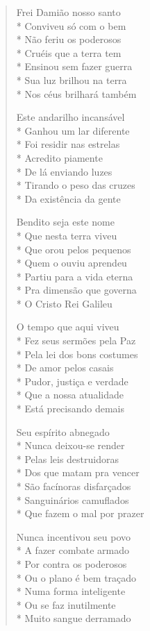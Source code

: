 \begin{verse}
Frei Damião nosso santo\\*
Conviveu só com o bem\\*
Não feriu os poderosos\\*
Cruéis que a terra tem\\*
Ensinou sem fazer guerra\\*
Sua luz brilhou na terra\\*
Nos céus brilhará também

Este andarilho incansável\\*
Ganhou um lar diferente\\*
Foi residir nas estrelas\\*
Acredito piamente\\*
De lá enviando luzes\\*
Tirando o peso das cruzes\\*
Da existência da gente

Bendito seja este nome\\*
Que nesta terra viveu\\*
Que orou pelos pequenos\\*
Quem o ouviu aprendeu\\*
Partiu para a vida eterna\\*
Pra dimensão que governa\\*
O Cristo Rei Galileu

O tempo que aqui viveu\\*
Fez seus sermões pela Paz\\*
Pela lei dos bons costumes\\*
De amor pelos casais\\*
Pudor, justiça e verdade\\*
Que a nossa atualidade\\*
Está precisando demais

Seu espírito abnegado\\*
Nunca deixou-se render\\*
Pelas leis destruidoras\\*
Dos que matam pra vencer\\*
São facínoras disfarçados\\*
Sanguinários camuflados\\*
Que fazem o mal por prazer

Nunca incentivou seu povo\\*
A fazer combate armado\\*
Por contra os poderosos\\*
Ou o plano é bem traçado\\*
Numa forma inteligente\\*
Ou se faz inutilmente\\*
Muito sangue derramado


\end{verse}
